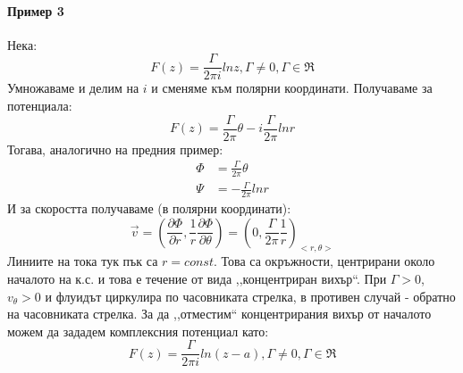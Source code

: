 \paragraph{Пример 3}
Нека:
\begin{equation*}
	F(z) = \frac{\Gamma}{2 \pi i} ln z, \Gamma \ne 0, \Gamma \in \Re
\end{equation*}
Умножаваме и делим на $i$ и сменяме към полярни координати. Получаваме за потенциала:
\begin{equation*}
	F(z) = \frac{\Gamma}{2 \pi} \theta - i \frac{\Gamma}{2\pi} ln r
\end{equation*}
Тогава, аналогично на предния пример:
\begin{align*}
	\Phi & = \frac{\Gamma}{2 \pi} \theta \\
	\Psi & = - \frac{\Gamma}{2 \pi} ln r
\end{align*}
И за скоростта получаваме (в полярни координати):
\begin{equation}
	\vec{v} = \left(\frac{\partial \Phi}{\partial r},\frac{1}{r}\frac{\partial \Phi}{\partial \theta}\right) = \left(0, \frac{\Gamma}{2 \pi} \frac{1}{r}\right)_{<r, \theta>}
\end{equation}
Линиите на тока тук пък са $r=const$. Това са окръжности, центрирани около началото на к.с. и това е течение от вида ,,концентриран вихър``. При $\Gamma >0$, $v_\theta >0$ и флуидът циркулира по часовниката стрелка, в противен случай - обратно на часовниката стрелка.
За да ,,отместим`` концентрирания вихър от началото можем да зададем комплексния потенциал като:
\begin{equation*}
	F(z) = \frac{\Gamma}{2 \pi i} ln (z-a), \Gamma \ne 0, \Gamma \in \Re
\end{equation*}

